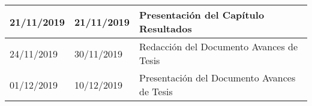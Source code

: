 \begin{table}[]
\begin{tabular}{|l|l|l|l|}
21/11/2019                       & \multicolumn{2}{l|}{21/11/2019} & Presentación del Capítulo Resultados                                                                                                                            \\ \hline
24/11/2019                       & \multicolumn{2}{l|}{30/11/2019} & Redacción del Documento Avances de Tesis                                                                                                                        \\ \hline
01/12/2019                       & \multicolumn{2}{l|}{10/12/2019} & Presentación del Documento Avances de Tesis                                                                                                                     \\ \hline
\end{tabular}
\end{table}

